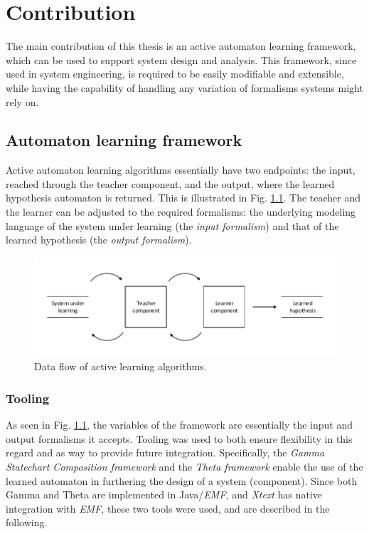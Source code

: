 \chapter{Contribution}\label{contrib}

The main contribution of this thesis is an active automaton learning framework, which can be used to support system design and analysis. This framework, since used in system engineering, is required to be easily modifiable and extensible, while having the capability of handling any variation of formalisms systems might rely on.


\section{Automaton learning framework}

Active automaton learning algorithms essentially have two endpoints: the input, reached through the teacher component, and the output, where the learned hypothesis automaton is returned. This is illustrated in Fig. \ref{fig:learningcomm}. The teacher and the learner can be adjusted to the required formalisms: the underlying modeling language of the system under learning (the \emph{input formalism}) and that of the learned hypothesis (the \emph{output formalism}). \\
\begin{figure}[H]
	\centering
	\includegraphics[width=1.0\linewidth]{figures/learningcomm}
	\caption{Data flow of active learning algorithms.}
	\label{fig:learningcomm}
\end{figure}

\subsection{Tooling}

As seen in Fig. \ref{fig:learningcomm}, the variables of the framework are essentially the input and output formalisms it accepts. Tooling was used to both ensure flexibility in this regard and as way to provide future integration. Specifically, the \emph{Gamma Statechart Composition framework}\cite{DBLP:conf/icse/MolnarGVMV18} and the \emph{Theta framework}\cite{theta-fmcad2017} enable the use of the learned automaton in furthering the design of a system (component). Since both Gamma and Theta are implemented in Java/\emph{EMF}, and \emph{Xtext} has native integration with \emph{EMF}, these two tools were used, and are described in the following.

